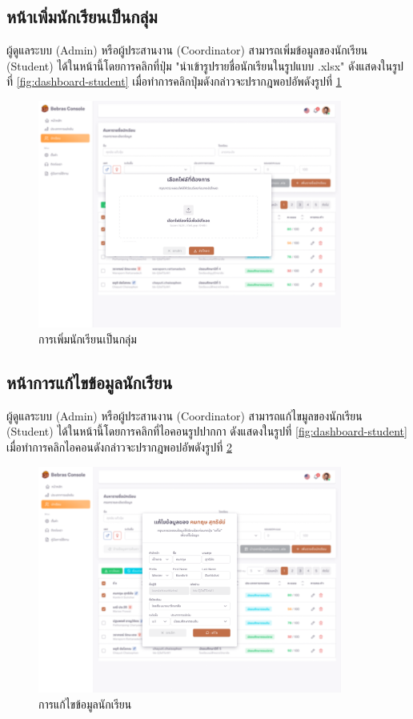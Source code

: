 \subsection{หน้าเพิ่มนักเรียนเป็นกลุ่ม}

ผู้ดูแลระบบ (Admin) หรือผู้ประสานงาน (Coordinator) สามารถเพิ่มข้อมูลของนักเรียน (Student) ได้ในหน้านี้โดยการคลิกที่ปุ่ม "นำเข้ารูปรายชื่อนักเรียนในรูปแบบ .xlsx" ดังแสดงในรูปที่ \ref{fig:dashboard-student} เมื่อทำการคลิกปุ่มดังกล่าวจะปรากฎพอปอัพดังรูปที่ \ref{fig:addStudentGroup}

\begin{figure}[H]
    \centering
    \includegraphics[width=100mm,scale=1.0]{images/addStudentGroup.png}
    \caption{การเพิ่มนักเรียนเป็นกลุ่ม}
    \label{fig:addStudentGroup}
\end{figure}

\subsection{หน้าการแก้ไขข้อมูลนักเรียน}

ผู้ดูแลระบบ (Admin) หรือผู้ประสานงาน (Coordinator) สามารถแก้ไขมูลของนักเรียน (Student) ได้ในหน้านี้โดยการคลิกที่ไอคอนรูปปากกา ดังแสดงในรูปที่ \ref{fig:dashboard-student} เมื่อทำการคลิกไอคอนดังกล่าวจะปรากฎพอปอัพดังรูปที่ \ref{fig:editStudent}

\begin{figure}[H]
    \centering
    \includegraphics[width=100mm,scale=1.0]{images/editStudent.png}
    \caption{การแก้ไขข้อมูลนักเรียน}
    \label{fig:editStudent}
\end{figure}


